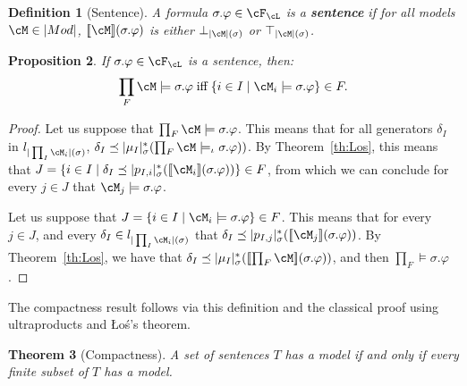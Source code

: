 \documentclass[preprint,3p,times]{elsarticle}
\newtheorem{definition}{Definition}[section]
\newtheorem{proposition}[definition]{Proposition}
\newtheorem{theorem}[definition]{Theorem}
\def\sem#1{[\![ #1 ] \!]}
\newcommand{\Los}{\L{}o{\'s}}
\begin{document}
\begin{definition}[Sentence]
    A formula \(\sigma.\varphi \in \cF_\cL\) is a {\bf sentence} if for all models \(\cM \in |Mod|\), $\sem{\cM}(\sigma.\varphi)$ is either $\bot_{|\cM|(\sigma)}$ or $\top_{|\cM|(\sigma)}$. 
\end{definition}

\begin{proposition}
\label{cor:Los}
If \(\sigma.\varphi \in \cF_\cL\) is a sentence, then:
\[
    \prod_F \cM \models \sigma.\varphi \; \mbox{iff} \; \{i \in I \mid \cM_i \models \sigma.\varphi\} \in F.
\]
\end{proposition}

\begin{proof}
Let us suppose that $\prod_F \cM \models \sigma.\varphi$. This means that for all generators $\delta_I$ in $l_{|\prod_I \cM_i|(\sigma)}$, $\delta_I \preceq |\mu_I|^*_\sigma(\prod_F \cM \models_\iota \sigma.\varphi))$. By Theorem~\ref{th:Los}, this means that $J = \{i \in I \mid \delta_I \preceq |p_{I,i}|^*_\sigma(\sem{\cM_i}(\sigma.\varphi))\} \in F$, from which we can conclude for every $j \in J$ that $\cM_j \models \sigma.\varphi$.

\medskip
Let us suppose that $J = \{i \in I \mid \cM_i \models \sigma.\varphi\} \in F$. This means that for every $j \in J$, and every $\delta_I \in l_{|\prod_I \cM_i|(\sigma)}$ that $\delta_I \preceq |p_{I,j}|^*_\sigma(\sem{\cM_j}(\sigma.\varphi))$. By Theorem~\ref{th:Los}, we have that $\delta_I \preceq |\mu_I|^*_\sigma(\sem{\prod_F \cM}(\sigma.\varphi))$, and then $\prod_F \models \sigma.\varphi$.
\end{proof}

The compactness result follows via this definition and the classical proof using ultraproducts and \Los's theorem.

\begin{theorem}[Compactness]
\label{th:compactness}
A set of sentences $T$ has a model if and only if every finite subset of $T$ has a model.
\end{theorem}
\end{document}
